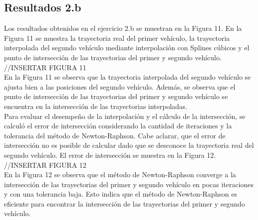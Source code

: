 \subsection{Resultados 2.b}
Los resultados obtenidos en el ejercicio 2.b se muestran en la Figura 11. En la Figura 11 se muestra la trayectoria real del primer vehículo, la trayectoria interpolada del segundo vehículo mediante interpolación con Splines cúbicos y el punto de intersección de las trayectorias del primer y segundo vehículo.\\
//INSERTAR FIGURA 11\\
En la Figura 11 se observa que la trayectoria interpolada del segundo vehículo se ajusta bien a las posiciones del segundo vehículo. Además, se observa que el punto de intersección de las trayectorias del primer y segundo vehículo se encuentra en la intersección de las trayectorias interpoladas.\\
Para evaluar el desempeño de la interpolación y el cálculo de la intersección, se calculó el error de intersección considerando la cantidad de iteraciones y la tolerancia del método de Newton-Raphson. Cabe aclarar, que el error de intersección no es posible de calcular dado que se desconoce la trayectoria real del segundo vehículo. El error de intersección se muestra en la Figura 12.\\
//INSERTAR FIGURA 12\\
En la Figura 12 se observa que el método de Newton-Raphson converge a la intersección de las trayectorias del primer y segundo vehículo en pocas iteraciones y con una tolerancia baja. Esto indica que el método de Newton-Raphson es eficiente para encontrar la intersección de las trayectorias del primer y segundo vehículo.\\

